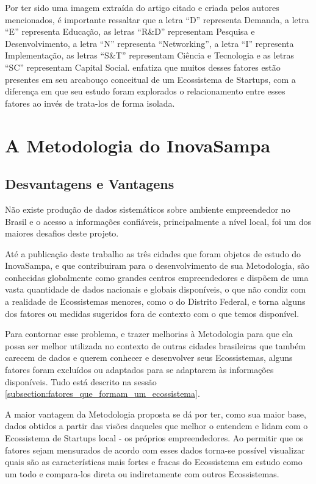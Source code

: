 Por ter sido uma imagem extraída do artigo citado e criada pelos autores mencionados, é importante ressaltar que a letra ``D'' representa Demanda, a letra ``E'' representa Educação, as letras ``R\&D'' representam Pesquisa e Desenvolvimento, a letra ``N'' representa ``Networking'', a letra ``I'' representa Implementação, as letras ``S\&T'' representam Ciência e Tecnologia e as letras ``SC'' representam Capital Social.  enfatiza que muitos desses fatores estão presentes em seu arcabouço conceitual de um Ecossistema de Startups, com a diferença em que seu estudo foram explorados o relacionamento entre esses fatores ao invés de trata-los de forma isolada.

\section{A Metodologia do InovaSampa}
\label{section:metodologia_do_inovasampa}

\subsection{Desvantagens e Vantagens}
\label{subsection:vantagens_e_desvantagens}

Não existe produção de dados sistemáticos sobre ambiente empreendedor no Brasil e o acesso a informações confiáveis, principalmente a nível local, foi um dos maiores desafios deste projeto.

Até a publicação deste trabalho as três cidades que foram objetos de estudo do InovaSampa, e que contribuiram para o desenvolvimento de sua Metodologia, são conhecidas globalmente como grandes centros empreendedores e dispõem de uma vasta quantidade de dados nacionais e globais disponíveis, o que não condiz com a realidade de Ecossistemas menores, como o do Distrito Federal, e torna alguns dos fatores ou medidas sugeridos fora de contexto com o que temos disponível.

Para contornar esse problema, e trazer melhorias à Metodologia para que ela possa ser melhor utilizada no contexto de outras cidades brasileiras que também carecem de dados e querem conhecer e desenvolver seus Ecossistemas, alguns fatores foram excluídos ou adaptados para se adaptarem às informações disponíveis. Tudo está descrito na sessão \ref{subsection:fatores_que_formam_um_ecossistema}.

A maior vantagem da Metodologia proposta se dá por ter, como sua maior base, dados obtidos a partir das visões daqueles que melhor o entendem e lidam com o Ecossistema de Startups local - os próprios empreendedores. Ao permitir que os fatores sejam mensurados de acordo com esses dados torna-se possível visualizar quais são as características mais fortes e fracas do Ecossistema em estudo como um todo e compara-los direta ou indiretamente com outros Ecossistemas.

